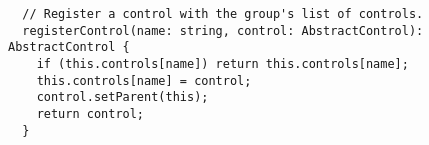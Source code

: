 \begin{verbatim}
  // Register a control with the group's list of controls.
  registerControl(name: string, control: AbstractControl): AbstractControl {
    if (this.controls[name]) return this.controls[name];
    this.controls[name] = control;
    control.setParent(this);
    return control;
  }
\end{verbatim}
